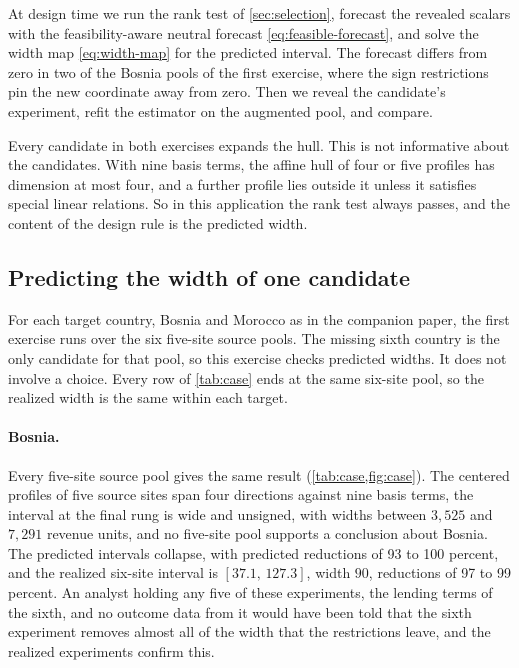 At design time we run the rank test of \cref{sec:selection}, forecast
the revealed scalars with the feasibility-aware neutral forecast
\eqref{eq:feasible-forecast}, and solve the width map
\eqref{eq:width-map} for the predicted interval. The forecast differs
from zero in two of the Bosnia pools of the first exercise, where the
sign restrictions pin the new coordinate away from zero. Then we reveal
the candidate's experiment, refit the estimator on the augmented pool,
and compare.

Every candidate in both exercises expands the hull. This is not
informative about the candidates. With nine basis terms, the affine
hull of four or five profiles has dimension at most four, and a further
profile lies outside it unless it satisfies special linear relations. So
in this application the rank test always passes, and the content of the
design rule is the predicted width.

\subsection{Predicting the width of one candidate}
\label{subsec:case-bosnia}

For each target country, Bosnia and Morocco as in the companion paper,
the first exercise runs over the six five-site source pools. The
missing sixth country is the only candidate for that pool, so this
exercise checks predicted widths. It does not involve a choice. Every
row of \cref{tab:case} ends at the same six-site pool, so the realized
width is the same within each target.

\paragraph{Bosnia.}
Every five-site source pool gives the same result
(\cref{tab:case,fig:case}). The centered profiles of five source sites
span four directions against nine basis terms, the interval at the final
rung is wide and unsigned, with widths between $3{,}525$ and $7{,}291$
revenue units, and no five-site pool supports a conclusion about
Bosnia. The predicted intervals collapse, with predicted reductions of
93 to 100 percent, and the realized six-site interval is
$[37.1,\,127.3]$, width $90$, reductions of 97 to 99 percent. An analyst
holding any five of these experiments, the lending terms of the sixth,
and no outcome data from it would have been told that the sixth
experiment removes almost all of the width that the restrictions leave,
and the realized experiments confirm this.

